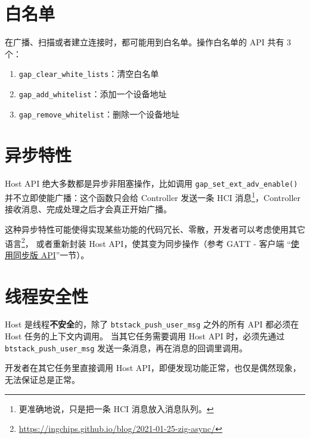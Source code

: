 \documentclass[
  12pt,
]{book}
\makeatletter
\newenvironment{kframe}{%
\medskip{}
\setlength{\fboxsep}{.8em}
 \def\at@end@of@kframe{}%
 \ifinner\ifhmode%
  \def\at@end@of@kframe{\end{minipage}}%
  \begin{minipage}{\columnwidth}%
 \fi\fi%
 \def\FrameCommand##1{\hskip\@totalleftmargin \hskip-\fboxsep
 \colorbox{shadecolor}{##1}\hskip-\fboxsep
     \hskip-\linewidth \hskip-\@totalleftmargin \hskip\columnwidth}%
 \MakeFramed {\advance\hsize-\width
   \@totalleftmargin\z@ \linewidth\hsize
   \@setminipage}}%
 {\par\unskip\endMakeFramed%
 \at@end@of@kframe}
\newenvironment{rmdblock}[1]
  {
  \begin{itemize}
  \renewcommand{\labelitemi}{
    \raisebox{-.7\height}[0pt][0pt]{
      {\setkeys{Gin}{width=3em,keepaspectratio}\texttt{[image: images/\#1]}}
    }
  }
  \setlength{\fboxsep}{1em}
  \begin{kframe}
  \item
  }
  {
  \end{kframe}
  \end{itemize}
  }
\newenvironment{rmdcaution}
  {\begin{rmdblock}{caution}}
  {\end{rmdblock}}
\makeatother
\begin{document}
\hypertarget{ux767dux540dux5355}{%
\section{白名单}\label{ux767dux540dux5355}}

在广播、扫描或者建立连接时，都可能用到白名单。操作白名单的 API 共有 3 个：

\begin{enumerate}
\def\labelenumi{\arabic{enumi}.}
\item
  \texttt{gap\_clear\_white\_lists}：清空白名单
\item
  \texttt{gap\_add\_whitelist}：添加一个设备地址
\item
  \texttt{gap\_remove\_whitelist}：删除一个设备地址
\end{enumerate}

\hypertarget{ux5f02ux6b65ux7279ux6027}{%
\section{异步特性}\label{ux5f02ux6b65ux7279ux6027}}

Host API 绝大多数都是异步非阻塞操作，比如调用 \texttt{gap\_set\_ext\_adv\_enable()} 并不立即使能广播：这个函数只会给 Controller
发送一条 HCI 消息\footnote{更准确地说，只是把一条 HCI 消息放入消息队列。}，Controller 接收消息、完成处理之后才会真正开始广播。

这种异步特性可能使得实现某些功能的代码冗长、零散，开发者可以考虑使用其它语言\footnote{\url{https://ingchips.github.io/blog/2021-01-25-zig-async/}}，
或者重新封装 Host API，使其变为同步操作（参考 GATT - 客户端 ``\protect\hyperlink{gatt-client-synced-api}{使用同步版 API}''一节）。

\hypertarget{ux7ebfux7a0bux5b89ux5168ux6027}{%
\section{线程安全性}\label{ux7ebfux7a0bux5b89ux5168ux6027}}

Host 是线程\textbf{不安全}的，除了 \texttt{btstack\_push\_user\_msg} 之外的所有 API 都必须在 Host 任务的上下文内调用。
当其它任务需要调用 Host API 时，必须先通过 \texttt{btstack\_push\_user\_msg} 发送一条消息，再在消息的回调里调用。

\begin{rmdcaution}
开发者在其它任务里直接调用 Host
API，即便发现功能正常，也仅是偶然现象，无法保证总是正常。
\end{rmdcaution}
\end{document}

